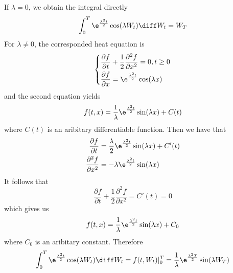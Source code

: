 \begin{subproblem}[(\alph*)]
        \item
        If $\lambda=0$, we obtain the integral directly
        \newcommand{\thisf}[1]{\e^{\frac{\lambda^2t}2}\cos(\lambda #1)}
        \[\int_0^T\thisf{W_t}\diff W_t=W_T\]
        For $\lambda\neq 0$,
        the corresponded heat equation is
        \[\left\{\begin{aligned}
            &\frac{\partial f}{\partial t}+\frac{1}{2}\frac{\partial^2 f}{\partial x^2}=0,t\geq 0\\
            &\frac{\partial f}{\partial x}=\thisf{x}
        \end{aligned}\right.\]
        and the second equation yields
        \[f(t,x)=\frac{1}{\lambda}\e^{\frac{\lambda^2t}{2}}\sin(\lambda x)+C(t)\]
        where $C(t)$ is an aribitary differentiable function. Then we have that
        \[\begin{aligned}
            \frac{\partial f}{\partial t}
            &=\frac{\lambda}{2}\e^{\frac{\lambda^2t}{2}}\sin(\lambda x)+C'(t)\\
            \frac{\partial^2 f}{\partial x^2}
            &=-\lambda\e^{\frac{\lambda^2t}{2}}\sin(\lambda x)\\
        \end{aligned}\]
        It follows that
        \[\frac{\partial f}{\partial t}+\frac{1}{2}\frac{\partial^2 f}{\partial x^2}
        =C'(t)=0\]
        which gives us
        \[f(t,x)=\frac{1}{\lambda}\e^{\frac{\lambda^2t}{2}}\sin(\lambda x)+C_0\]
        where $C_0$ is an aribitary constant.
        Therefore
        \[\int_0^T\thisf{W_t}\diff W_t=f(t,W_t)|_0^T
        =\frac{1}{\lambda}\e^{\frac{\lambda^2T}{2}}\sin(\lambda W_T)\]


\end{subproblem}
